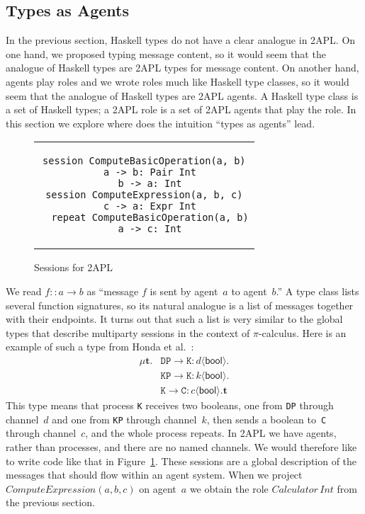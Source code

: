 \documentclass[conference,compsoc]{IEEEtran} %
\begin{document}
\subsection{Types as Agents} %

In the previous section, Haskell types do not have a clear analogue in
2APL. On one hand, we proposed typing message content, so it would seem
that the analogue of Haskell types are 2APL types for message content. On
another hand, agents play roles and we wrote roles much like Haskell type
classes, so it would seem that the analogue of Haskell types are 2APL
agents. A Haskell type class is a set of Haskell types; a 2APL role is a
set of 2APL agents that play the role. In this section we explore where
does the intuition ``types as agents'' lead.

\begin{figure}\footnotesize %
\begin{center}
\begin{tabular}{c}
\begin{lstlisting}[style=me]
session ComputeBasicOperation(a, b)
  a -> b: Pair Int
  b -> a: Int
session ComputeExpression(a, b, c)
  c -> a: Expr Int
  repeat ComputeBasicOperation(a, b)
  a -> c: Int
\end{lstlisting}
\end{tabular}
\end{center}
\caption{Sessions for 2APL}\label{fig:sessions}
\end{figure} %

{\def\l#1->#2:#3<#4>{\mathtt{#1}\to\mathtt{#2}:#3\langle\mathsf{#4}\rangle}
We read $f::a\to b$ as ``message $f$ is sent by agent~$a$ to agent~$b$.'' A
type class lists several function signatures, so its natural analogue is a
list of messages together with their endpoints. It turns out that such a
list is very similar to the global types that describe multiparty sessions
in the context of $\pi$-calculus. Here is an example of such a type from
Honda et al.~\cite{dblp:conf/popl/hondayc08}:
\begin{align*}
\mu\mathbf{t}. 
  &\l DP->K:d<bool>. \\
  &\l KP->K:k<bool>. \\
  &\l K->C:c<bool>.\mathbf{t}
\end{align*}
This type means that process \texttt{K} receives two booleans, one from
\texttt{DP} through channel~$d$ and one from \texttt{KP} through
channel~$k$, then sends a boolean to~\texttt{C} through channel~$c$, and
the whole process repeats. In 2APL we have agents, rather than processes,
and there are no named channels. We would therefore like to write code like
that in Figure~\ref{fig:sessions}.  These sessions are a global description
of the messages that should flow within an agent system. When we project
$\mathit{ComputeExpression}(a,b,c)$ on agent~$a$ we obtain the role
$\mathit{Calculator}\,\mathit{Int}$ from the previous section.}
\end{document}
